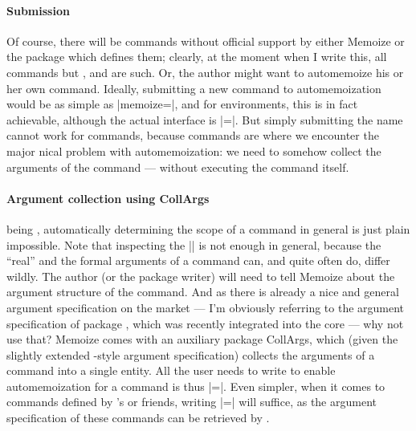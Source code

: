 \documentclass[a4paper,11pt]{article}
\begin{document}
\paragraph{Submission}
Of course, there will be commands without official support by either Memoize or
the package which defines them; clearly, at the moment when I write this, all
commands but ,  and  are such.  Or, the
author might want to automemoize his or her own command.  Ideally, submitting a
new command to automemoization would be as simple as
|memoize=|{}, and for environments, this is in fact achievable,
although the actual interface is
|=|.  But
simply submitting the name cannot work for commands, because commands are where
we encounter the major nical problem with automemoization: we need
to somehow collect the arguments of the command --- without executing the
command itself.

\paragraph{Argument collection using CollArgs}
 being , automatically determining the scope of a
command in general is just plain impossible.  Note that inspecting the
|\meaning| is not enough in general, because the ``real'' and the formal
arguments of a command can, and quite often do, differ wildly.  The author (or the
package writer) will need to tell Memoize about the argument structure of the
command.  And as there is already a nice and general argument specification on
the market --- I'm obviously referring to the argument specification of package
, which was recently integrated into the core 
--- why not use that?  Memoize comes with an auxiliary package CollArgs, which
(given the slightly extended -style argument specification)
collects the arguments of a command into a single entity.  All the user needs
to write to enable automemoization for a command is thus
|=|.  Even simpler,
when it comes to commands defined by 's 
or friends, writing |=|
will suffice, as the argument specification of these commands can be retrieved
by .
\end{document}
